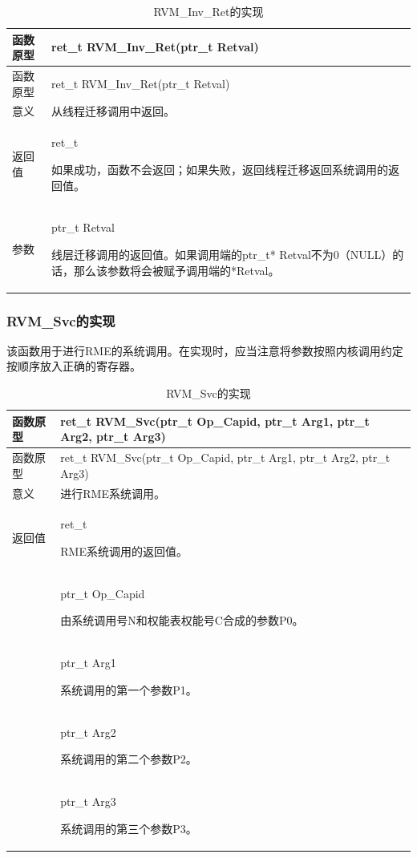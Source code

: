 \begin{xltabular}{\textwidth}{@{}>{\hsize\raggedright\arraybackslash}X>{\hsize\raggedright\arraybackslash}X@{}}
\caption{RVM\_\allowbreak{}Inv\_\allowbreak{}Ret的实现}\label{tab:8-11}\\
\toprule
函数原型 & ret\_\allowbreak{}t RVM\_\allowbreak{}Inv\_\allowbreak{}Ret(ptr\_\allowbreak{}t Retval)\tabularnewline
\endfirsthead
\toprule
函数原型 & ret\_\allowbreak{}t RVM\_\allowbreak{}Inv\_\allowbreak{}Ret(ptr\_\allowbreak{}t Retval)\tabularnewline
\midrule
\endhead
\bottomrule
\endlastfoot
意义 & 从线程迁移调用中返回。\tabularnewline
返回值\strut
 & ret\_\allowbreak{}t

如果成功，函数不会返回；如果失败，返回线程迁移返回系统调用的返回值。\strut
\tabularnewline
参数\strut
 & ptr\_\allowbreak{}t Retval

线层迁移调用的返回值。如果调用端的ptr\_t* Retval不为0（NULL）的话，那么该参数将会被赋予调用端的*Retval。\strut
\tabularnewline
\end{xltabular}

\subsubsection{RVM\_Svc的实现}\label{subsubsec:8-2-6-6}

该函数用于进行RME的系统调用。在实现时，应当注意将参数按照内核调用约定按顺序放入正确的寄存器。

\begin{xltabular}{\textwidth}{@{}>{\hsize\raggedright\arraybackslash}X>{\hsize\raggedright\arraybackslash}X@{}}
\caption{RVM\_\allowbreak{}Svc的实现}\label{tab:8-12}\\
\toprule
函数原型 & ret\_\allowbreak{}t RVM\_\allowbreak{}Svc(ptr\_\allowbreak{}t Op\_\allowbreak{}Capid, ptr\_\allowbreak{}t Arg1, ptr\_\allowbreak{}t Arg2,
ptr\_\allowbreak{}t Arg3)\tabularnewline
\endfirsthead
\toprule
函数原型 & ret\_\allowbreak{}t RVM\_\allowbreak{}Svc(ptr\_\allowbreak{}t Op\_\allowbreak{}Capid, ptr\_\allowbreak{}t Arg1, ptr\_\allowbreak{}t Arg2,
ptr\_\allowbreak{}t Arg3)\tabularnewline
\midrule
\endhead
\bottomrule
\endlastfoot
意义 & 进行RME系统调用。\tabularnewline
返回值\strut
 & ret\_\allowbreak{}t

RME系统调用的返回值。\strut
\tabularnewline
{} & ptr\_\allowbreak{}t Op\_\allowbreak{}Capid

由系统调用号N和权能表权能号C合成的参数P0。\strut
\tabularnewline
\strut
 & ptr\_\allowbreak{}t Arg1

系统调用的第一个参数P1。\strut
\tabularnewline
\strut
 & ptr\_\allowbreak{}t Arg2

系统调用的第二个参数P2。\strut
\tabularnewline
\strut
 & ptr\_\allowbreak{}t Arg3

系统调用的第三个参数P3。\strut
\tabularnewline
\end{xltabular}

